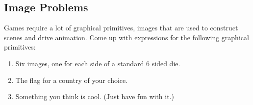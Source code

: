 \documentclass[nobib]{tufte-handout}
\begin{document}
\subsection{Image Problems}

Games require a lot of graphical primitives, images that are used to construct scenes and drive animation. Come up with expressions for the following graphical primitives:
\begin{enumerate}
  \item Six images, one for each side of a standard 6 sided die.
  \item The flag for a country of your choice.
  \item Something you think is cool. (Just have fun with it.)
\end{enumerate}
\end{document}

